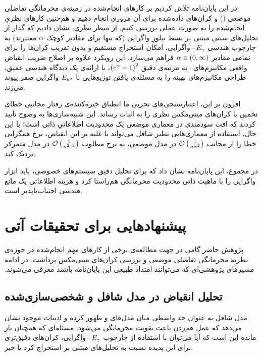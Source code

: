 در این پایان‌نامه تلاش کردیم بر کارهای انجام‌شده در زمینه‌ی محرمانگی تفاضلی موضعی () و کران‌های داده‌شده برای آن مروری انجام دهیم و هم‌چنین کارهای نظریِ انجام‌شده را به صورت عملی بررسی کنیم. از منظر نظری، نشان دادیم که گذار از تحلیل‌های سنتی مبتنی بر بسط تیلورِ واگرایی  (که تنها برای مقادیر کوچک $\alpha$ معتبرند) به چارچوب هندسی $-E_{\gamma}$واگرایی، امکان استخراج مستقیم و بدون تقریب کران‌ها را برای تمامی مقادیر $\alpha \in (0, \infty)$ فراهم می‌سازد. این رویکرد علاوه بر اصلاح ضریب انقباض واقعی مکانیزم‌های \LDP\ به مرتبه‌ی دقیق $\left( e^{\alpha} - 1 \right)^2$، با ارائه‌ی یک دیدگاه هندسی عمیق، طراحی مکانیزم‌های بهینه را به مسئله‌ی یافتن توزیع‌هایی با $E_{e^{\alpha}}$-واگرایی صفر پیوند می‌زند.

افزون بر این، اعتبارسنجی‌های تجربی ما انطباق خیره‌کننده‌ی رفتار مجانبی خطای تخمین با کران‌های مینی‌مکس نظری را به اثبات رساند. این شبیه‌سازی‌ها به وضوح تأیید کردند که افت سودمندی در معماری موضعی یک محدودیت اطلاعاتیِ ذاتی است؛ با این حال، استفاده از معماری‌هایی نظیر شافل می‌تواند با غلبه بر این انقباض، نرخ همگرایی خطا را از مجانب $\mathcal{O}\left( \frac{1}{n \alpha^2} \right)$ در مدل موضعی، به نرخ مطلوب $\mathcal{O}\left( \frac{1}{n^2 \varepsilon^2} \right)$ در مدل متمرکز نزدیک کند.

در مجموع، این پایان‌نامه نشان داد که برای تحلیل دقیق سیستم‌های خصوصی، باید ابزار واگرایی را با ماهیت ذاتی محدودیت محرمانگی هم‌راستا کرد و هزینه اطلاعاتی  یک مانع هندسی اجتناب‌ناپذیر است.


\section{پیشنهادهایی برای تحقیقات آتی}
\label{sec:future-works}

‫پژوهش حاضر گامی در جهت مطالعه‌ی برخی از کارهای مهم انجام‌شده در حوزه‌ی نظریه محرمانگی تفاضلی موضعی و بررسی کران‌های مینی‌مکس برداشت. در ادامه مسیرهای پژوهشی‌ای که می‌توانند امتداد طبیعی این پایان‌نامه باشند معرفی می‌شوند.

\subsection{تحلیل انقباض در مدل شافل و شخصی‌سازی‌شده}
مدل شافل به عنوان حد واسطی میان مدل‌های  و  ظهور کرده و ادبیات موجود نشان می‌دهد که عمل هم‌زدن باعث تقویت محرمانگی می‌شود. مسئله‌ای که همچنان باز مانده این است که آیا می‌توان با استفاده از چارچوب $-E_{\gamma}$واگرایی، کران‌های دقیق‌تری برای این پدیده نسبت به تحلیل‌های مبتنی بر  استخراج کرد یا خیر.

